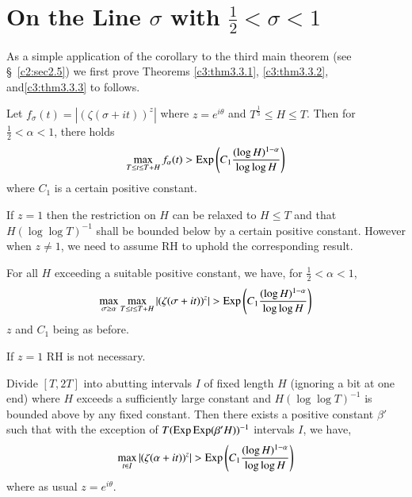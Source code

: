 \section{On the Line $\sigma$ with $\frac{1}{2} <\sigma < 1$}\label{c3:sec3.3}
As a simple application of the corollary to the third main theorem (see \S\ \ref{c2:sec2.5}) we first prove Theorems \ref{c3:thm3.3.1}, \ref{c3:thm3.3.2}, and\pageoriginale \ref{c3:thm3.3.3} to follows.

\begin{theorem}\label{c3:thm3.3.1}
Let $f_\sigma (t) = |(\zeta (\sigma + it))^z|$ where $z = e^{i\theta}$ and $T^{\frac{1}{3}} \leq H \leq T$. Then for $\frac{1}{2} < \alpha <1$, there holds
$$
\max\limits_{T \leq t \leq T+ H} f_\alpha (t) >\operatorname{Exp} \left(C_1 \frac{(\log H)^{1-\alpha}}{\log \log H} \right)
$$
where $C_1$ is a certain positive constant.
\end{theorem}

\begin{remark*}
If $z=1$ then the restriction on $H$ can be relaxed to $H \leq T$ and that $H(\log \log T)^{-1}$ shall be bounded below by a certain positive constant. However when $z \neq 1$, we need to assume RH to uphold the corresponding result.
\end{remark*}

\begin{theorem}[on RH]\label{c3:thm3.3.2}
For all $H$ exceeding a suitable positive constant, we have, for $\frac{1}{2} < \alpha < 1$, 
$$
\max\limits_{\sigma \geq \alpha} \max\limits_{T \leq t \leq T + H} |(\zeta(\sigma + it))^z| >\operatorname{Exp} \left(C_1 \frac{(\log H)^{1-\alpha}}{\log \log H} \right)
$$
$z$ and $C_1$ being as before.
\end{theorem}

\begin{remark*}
If $z =1$ RH is not necessary.
\end{remark*}

\begin{theorem}\label{c3:thm3.3.3}
Divide $[T,2T]$ into abutting intervals $I$ of fixed length $H$
(ignoring a bit at one end) where $H$ exceeds a sufficiently large
constant and $H(\log \log T)^{-1}$ is bounded above by any fixed
constant. Then there exists a positive constant $\beta'$ such that
with the exception of $T(\Exp\break\Exp (\beta'H))^{-1}$ intervals $I$, we
have, 
$$
\max\limits_{t\in I} |(\zeta(\alpha + it))^z| > \operatorname{Exp} \left(C_1 \frac{(\log H)^{1-\alpha}}{\log \log H} \right)
$$
where as usual $z =e^{i\theta}$.
\end{theorem}

